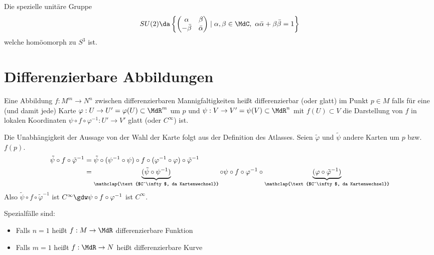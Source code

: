 \documentclass[a4paper,twoside,DIV15,BCOR12mm]{scrbook}
\begin{document}
\begin{beispiele}
\begin{beispiele}
\item Die spezielle unitäre Gruppe 
\[ SU(2) \da \left\{
\begin{pmatrix} \alpha & \beta \\ -\bar\beta & \bar\alpha \end{pmatrix} \mid \alpha, \beta \in \MdC,\ \alpha\bar\alpha + \beta\bar\beta =1 \right\} \]
welche homöomorph zu $S^3$ ist.
\end{beispiele}
\end{beispiele}

\section{Differenzierbare Abbildungen}
\begin{definition}
Eine Abbildung $f:M^m\to N^n$ zwischen differenzierbaren Mannigfaltigkeiten heißt differenzierbar (oder glatt) im Punkt $p\in M$ falls für eine (und damit jede) Karte $\varphi: U \to U'=\varphi(U)\subset\MdR^m$ um $p$ und $\psi:V\to V'=\psi(V)\subset \MdR^n$ mit $f(U)\subset V$ die Darstellung von $f$ in lokalen Koordinaten $\psi\circ f\circ\varphi^{-1}: U' \to V'$ glatt (oder $C^\infty$) ist.
\end{definition}

Die Unabhängigkeit der Aussage von der Wahl der Karte folgt aus der Definition des Atlasses. Seien $\tilde\varphi$ und $\tilde\psi$ andere Karten um $p$ bzw. $f(p)$.
\begin{align*}
\tilde\psi \circ f \circ \tilde\varphi^{-1} &= \tilde\psi \circ (\psi^{-1} \circ \psi) \circ f \circ (\varphi^{-1} \circ \varphi) \circ \tilde\varphi^{-1} \\
 &= \underbrace{(\tilde\psi \circ \psi^{-1})}_{\mathclap{\text{$C^\infty$, da Kartenwechsel}}} \circ \psi \circ f \circ \varphi^{-1} \circ \underbrace{(\varphi \circ \tilde\varphi^{-1})}_{\mathclap{\text{$C^\infty$, da Kartenwechsel}}}
\end{align*}
Also $\tilde\psi \circ f \circ \tilde \varphi^{-1}$ ist $C^\infty \gdw \psi \circ f \circ \varphi^{-1}$ ist $C^\infty$.

Spezialfälle sind:
\begin{itemize}
\item Falls $n=1$ heißt $f:M\to \MdR$ differenzierbare Funktion
\item Falls $m=1$ heißt $f:\MdR\to N$ heißt differenzierbare Kurve
\end{itemize}
\end{document}
